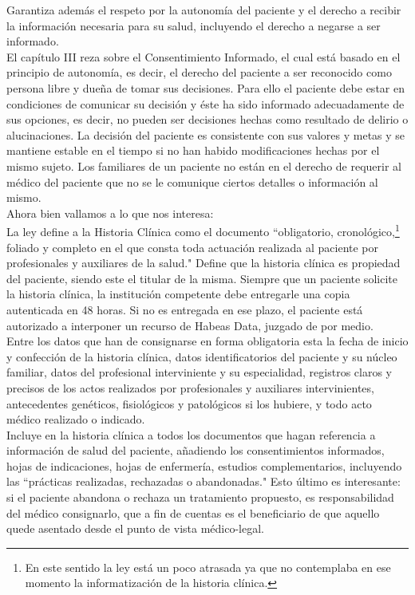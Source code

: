 Garantiza además el respeto por la autonomía del paciente y el derecho a recibir la información necesaria para su salud, incluyendo el derecho a negarse a ser informado.\\[0.1cm]

El capítulo III reza sobre el Consentimiento Informado, el cual está basado en el principio de autonomía, es decir, el derecho del paciente a ser reconocido como persona libre y dueña de tomar sus decisiones. Para ello el paciente debe estar en condiciones de comunicar su decisión y  éste ha sido informado adecuadamente de 
sus opciones, es decir, no pueden ser decisiones hechas como resultado de delirio o alucinaciones. La decisión del paciente es consistente con sus valores y metas y se mantiene estable en el tiempo si no han habido modificaciones hechas por el mismo sujeto. Los familiares de un paciente no están en el derecho de 
requerir al médico del paciente que no se le comunique ciertos detalles o información al mismo. \\[0.1cm]

Ahora bien vallamos a lo que nos interesa:\\[0.1cm]

La ley define a la Historia Clínica como el documento ``obligatorio, cronológico,\footnote{En este sentido la ley está un poco atrasada ya que no contemplaba en ese momento la informatización de la historia clínica.} foliado y completo en el que consta toda actuación realizada al paciente por profesionales y auxiliares de la salud." Define que la historia clínica es propiedad del paciente, siendo este el titular de la misma. Siempre que un paciente solicite la historia clínica, la institución competente debe entregarle una copia autenticada en 48 horas. Si no es entregada en ese plazo, el paciente está autorizado a interponer un recurso de Habeas Data, juzgado de por medio. \\[0.1cm]

Entre los datos que han de consignarse en forma obligatoria esta la fecha de inicio y confección de la historia clínica, datos identificatorios del paciente y su núcleo familiar, datos del profesional interviniente y su especialidad, registros claros y precisos de los actos realizados por profesionales y auxiliares intervinientes, antecedentes genéticos, fisiológicos y patológicos si los hubiere, y todo acto médico realizado o indicado.\\[0.1cm]

Incluye en la historia clínica a todos los documentos que hagan referencia a  información de salud del paciente, añadiendo los consentimientos informados, hojas de indicaciones, hojas de enfermería, estudios complementarios,  incluyendo las ``prácticas realizadas, rechazadas o abandonadas." Esto  último es interesante: si el paciente abandona o rechaza un tratamiento propuesto, es responsabilidad del médico consignarlo, que a fin de cuentas es el beneficiario de que aquello quede asentado desde el punto de vista médico-legal.\\[0.1cm]

